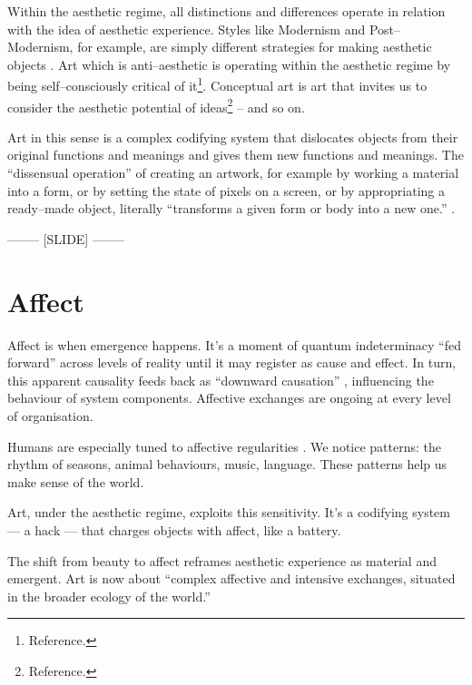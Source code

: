 \documentclass[letter:wpaper]{article}
\begin{document}
    Within the aesthetic regime, all distinctions and differences operate in relation with the idea of aesthetic experience. Styles like Modernism and Post–Modernism, for example, are simply different strategies for making aesthetic objects \citep[p213]{ZepkeSblmArt2017}. Art which is anti–aesthetic is operating within the aesthetic regime by being self–consciously critical of it\footnote{
        Reference.
    }. Conceptual art is art that invites us to consider the aesthetic potential of ideas\footnote{
        Reference.
    } -- and so on.

    Art in this sense is a complex codifying system that dislocates objects from their original functions and meanings and gives them new functions and meanings. The ``dissensual operation'' \citep[p.54]{RancierThEmncptdSpcttr2009} of creating an artwork, for example by working a material into a form, or by setting the state of pixels on a screen, or by appropriating a ready–made object, literally ``transforms a given form or body into a new one.'' \citep[p.54]{RancierThEmncptdSpcttr2009}.

-------- [SLIDE] --------

\section{Affect}

Affect is when emergence happens. It’s a moment of quantum indeterminacy “fed forward” across levels of reality \citep[p.37]{MassumiPrblsFrThVrtl2002} until it may register as cause and effect. In turn, this apparent causality feeds back as “downward causation” \citep[p.?]{FlackCrsGrnng2017}, influencing the behaviour of system components. Affective exchanges are ongoing at every level of organisation.

Humans are especially tuned to affective regularities \citep{FristonThFrEnrgPrncpl2010, DeaconTheSymbolicSpecies1998}. We notice patterns: the rhythm of seasons, animal behaviours, music, language. These patterns help us make sense of the world.

Art, under the aesthetic regime, exploits this sensitivity. It’s a codifying system — a hack — that charges objects with affect, like a battery.

The shift from beauty to affect reframes aesthetic experience as material and emergent. Art is now about “complex affective and intensive exchanges, situated in the broader ecology of the world.” \citep[p.155]{HighmoreBttrAftrTst2010}
\end{document}
